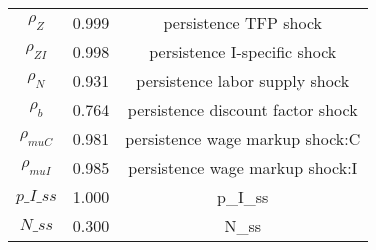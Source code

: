 \begin{center}
\begin{longtable}{ccc}
${\rho_Z}$ 	 & 	 0.999 	 & 	 persistence TFP shock\\
${\rho_{ZI}}$ 	 & 	 0.998 	 & 	 persistence I-specific shock\\
${\rho_N}$ 	 & 	 0.931 	 & 	 persistence labor supply shock\\
${\rho_b}$ 	 & 	 0.764 	 & 	 persistence discount factor shock\\
${\rho_{muC}}$ 	 & 	 0.981 	 & 	 persistence wage markup shock:C\\
${\rho_{muI}}$ 	 & 	 0.985 	 & 	 persistence wage markup shock:I\\
$p\_I\_ss$ 	 & 	 1.000 	 & 	 p\_I\_ss\\
$N\_ss$ 	 & 	 0.300 	 & 	 N\_ss\\
\bottomrule%
\end{longtable}
\end{center}
